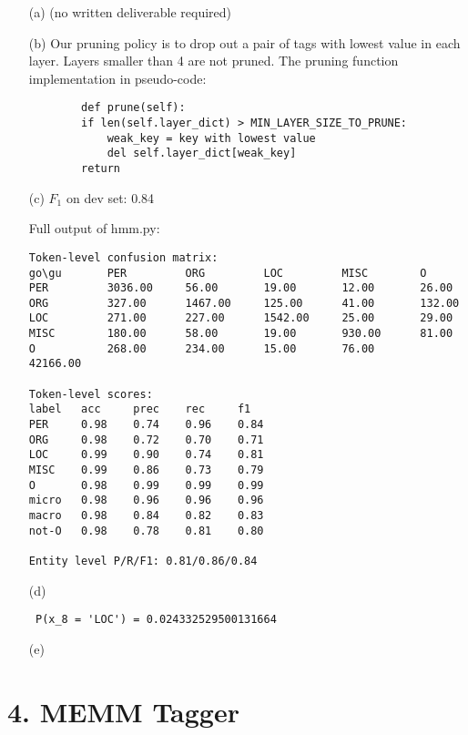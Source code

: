 \documentclass{article}
\begin{document}
\begin{itemize}
    \item[(a)] (no written deliverable required)
    \item[(b)] Our pruning policy is to drop out a pair of tags with lowest value in each layer. Layers smaller than 4 are not pruned. The pruning function implementation in pseudo-code:
    \begin{verbatim}
        def prune(self):
        if len(self.layer_dict) > MIN_LAYER_SIZE_TO_PRUNE:
            weak_key = key with lowest value
            del self.layer_dict[weak_key]
        return
    \end{verbatim}
   
    \item[(c)] $F_1$ on dev set: 0.84
    
    Full output of hmm.py:

    \begin{verbatim}
Token-level confusion matrix:
go\gu   	PER     	ORG     	LOC     	MISC    	O       
PER     	3036.00 	56.00   	19.00   	12.00   	26.00   
ORG     	327.00  	1467.00 	125.00  	41.00   	132.00  
LOC     	271.00  	227.00  	1542.00 	25.00   	29.00   
MISC    	180.00  	58.00   	19.00   	930.00  	81.00   
O       	268.00  	234.00  	15.00   	76.00   	42166.00

Token-level scores:
label	acc  	prec 	rec  	f1   
PER  	0.98 	0.74 	0.96 	0.84 
ORG  	0.98 	0.72 	0.70 	0.71 
LOC  	0.99 	0.90 	0.74 	0.81 
MISC 	0.99 	0.86 	0.73 	0.79 
O    	0.98 	0.99 	0.99 	0.99 
micro	0.98 	0.96 	0.96 	0.96 
macro	0.98 	0.84 	0.82 	0.83 
not-O	0.98 	0.78 	0.81 	0.80 

Entity level P/R/F1: 0.81/0.86/0.84
    \end{verbatim}

    \item[(d)] \begin{verbatim} P(x_8 = 'LOC') = 0.024332529500131664 \end{verbatim}
    \item[(e)]
\end{itemize}

\section*{4. MEMM Tagger}
\end{document}
